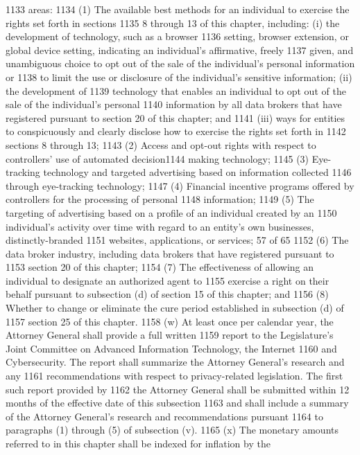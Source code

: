 1133 areas:
1134 (1) The available best methods for an individual to exercise the rights set forth in sections
1135 8 through 13 of this chapter, including: (i) the development of technology, such as a browser
1136 setting, browser extension, or global device setting, indicating an individual’s affirmative, freely
1137 given, and unambiguous choice to opt out of the sale of the individual’s personal information or
1138 to limit the use or disclosure of the individual’s sensitive information; (ii) the development of
1139 technology that enables an individual to opt out of the sale of the individual’s personal
1140 information by all data brokers that have registered pursuant to section 20 of this chapter; and
1141 (iii) ways for entities to conspicuously and clearly disclose how to exercise the rights set forth in
1142 sections 8 through 13;
1143 (2) Access and opt-out rights with respect to controllers’ use of automated decision1144 making technology;
1145 (3) Eye-tracking technology and targeted advertising based on information collected
1146 through eye-tracking technology;
1147 (4) Financial incentive programs offered by controllers for the processing of personal
1148 information;
1149 (5) The targeting of advertising based on a profile of an individual created by an
1150 individual’s activity over time with regard to an entity’s own businesses, distinctly-branded
1151 websites, applications, or services;
57 of 65
1152 (6) The data broker industry, including data brokers that have registered pursuant to
1153 section 20 of this chapter;
1154 (7) The effectiveness of allowing an individual to designate an authorized agent to
1155 exercise a right on their behalf pursuant to subsection (d) of section 15 of this chapter; and
1156 (8) Whether to change or eliminate the cure period established in subsection (d) of
1157 section 25 of this chapter.
1158 (w) At least once per calendar year, the Attorney General shall provide a full written
1159 report to the Legislature’s Joint Committee on Advanced Information Technology, the Internet
1160 and Cybersecurity. The report shall summarize the Attorney General’s research and any
1161 recommendations with respect to privacy-related legislation. The first such report provided by
1162 the Attorney General shall be submitted within 12 months of the effective date of this subsection
1163 and shall include a summary of the Attorney General’s research and recommendations pursuant
1164 to paragraphs (1) through (5) of subsection (v).
1165 (x) The monetary amounts referred to in this chapter shall be indexed for inflation by the
